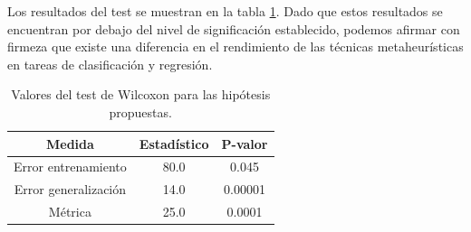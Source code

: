 Los resultados del test se muestran en la tabla \ref{tab:test}. Dado que estos resultados se encuentran por debajo del nivel de significación establecido, podemos afirmar con firmeza que existe una diferencia en el rendimiento de las técnicas metaheurísticas en tareas de clasificación y regresión.

\begin{table}[]
\centering
\begin{tabular}{|c|c|c|}
\hline
\textbf{Medida}      & \textbf{Estadístico} & \textbf{P-valor} \\ \hline
Error entrenamiento  & 80.0                 & 0.045            \\ \hline
Error generalización & 14.0                 & 0.00001          \\ \hline
Métrica              & 25.0                 & 0.0001           \\ \hline
\end{tabular}
\caption{Valores del test de Wilcoxon para las hipótesis propuestas.}
\label{tab:test}
\end{table}




\begin{table}[]
\caption{Mayores y menores diferencias de tiempo, expresada en veces mayor, de los entrenamientos en los conjuntos de datos de BCW, WQC y F-MNIST, entre las técnicas metaheurísticas y optimizadores basados en gradiente descendente.}
\label{tab:timesmaxmin}
\end{table}


